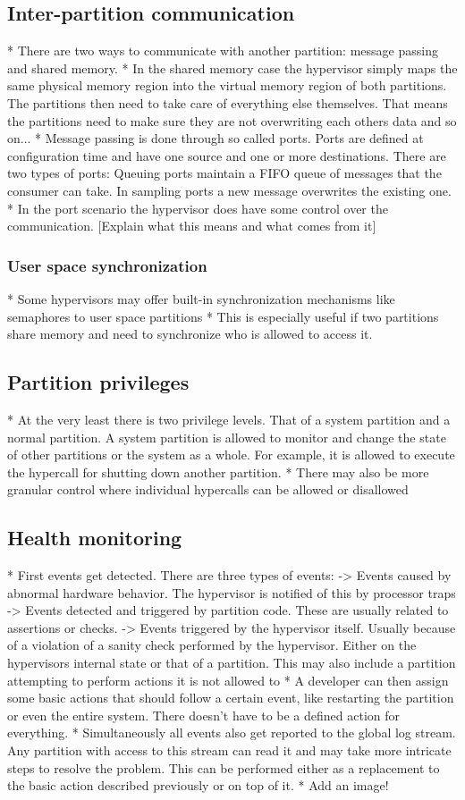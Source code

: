 \subsection{Inter-partition communication}
* There are two ways to communicate with another partition: message passing and shared memory.
* In the shared memory case the hypervisor simply maps the same physical memory region into the virtual memory region of both partitions. The partitions then need to take care of everything else themselves. That means the partitions need to make sure they are not overwriting each others data and so on...
* Message passing is done through so called ports. Ports are defined at configuration time and have one source and one or more destinations. There are two types of ports: Queuing ports maintain a FIFO queue of messages that the consumer can take. In sampling ports a new message overwrites the existing one. 
* In the port scenario the hypervisor does have some control over the communication. [Explain what this means and what comes from it]
\subsubsection{User space synchronization}
* Some hypervisors may offer built-in synchronization mechanisms like semaphores to user space partitions
* This is especially useful if two partitions share memory and need to synchronize who is allowed to access it. 
\subsection{Partition privileges}
* At the very least there is two privilege levels. That of a system partition and a normal partition. A system partition is allowed to monitor and change the state of other partitions or the system as a whole. For example, it is allowed to execute the hypercall for shutting down another partition.
* There may also be more granular control where individual hypercalls can be allowed or disallowed
\subsection{Health monitoring}
* First events get detected. There are three types of events:
    -> Events caused by abnormal hardware behavior. The hypervisor is notified of this by processor traps
    -> Events detected and triggered by partition code. These are usually related to assertions or checks.
    -> Events triggered by the hypervisor itself. Usually because of a violation of a sanity check performed by the hypervisor. Either on the hypervisors internal state or that of a partition. This may also include a partition attempting to perform actions it is not allowed to
* A developer can then assign some basic actions that should follow a certain event, like restarting the partition or even the entire system. There doesn't have to be a defined action for everything.
* Simultaneously all events also get reported to the global log stream. Any partition with access to this stream can read it and may take more intricate steps to resolve the problem. This can be performed either as a replacement to the basic action described previously or on top of it.
* Add an image!
